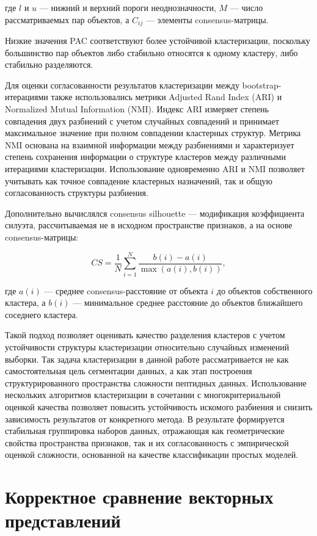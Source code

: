 \documentclass[specification,annotation,times]{itmo-student-thesis}
\begin{document}
где \(l\) и \(u\) --- нижний и верхний пороги неоднозначности,
\(M\) --- число рассматриваемых пар объектов,
а \(C_{ij}\) --- элементы consensus-матрицы.

Низкие значения PAC соответствуют более устойчивой кластеризации, поскольку большинство пар объектов либо стабильно относятся к одному кластеру, либо стабильно разделяются.

Для оценки согласованности результатов кластеризации между bootstrap-итерациями также использовались метрики Adjusted Rand Index (ARI) и Normalized Mutual Information (NMI). Индекс ARI измеряет степень совпадения двух разбиений с учетом случайных совпадений и принимает максимальное значение при полном совпадении кластерных структур. Метрика NMI основана на взаимной информации между разбиениями и характеризует степень сохранения информации о структуре кластеров между различными итерациями кластеризации. Использование одновременно ARI и NMI позволяет учитывать как точное совпадение кластерных назначений, так и общую согласованность структуры разбиения.

Дополнительно вычислялся consensus silhouette — модификация коэффициента силуэта, рассчитываемая не в исходном пространстве признаков, а на основе consensus-матрицы:

\[
CS =
\frac{1}{N}
\sum_{i=1}^{N}
\frac{
b(i)-a(i)
}{
\max(a(i), b(i))
},
\]

где \(a(i)\) --- среднее consensus-расстояние
от объекта \(i\) до объектов собственного кластера,
а \(b(i)\) --- минимальное среднее расстояние
до объектов ближайшего соседнего кластера.

Такой подход позволяет оценивать качество разделения кластеров с учетом устойчивости структуры кластеризации относительно случайных изменений выборки.
Так задача кластеризации в данной работе рассматривается не как самостоятельная цель сегментации данных, а как этап построения структурированного пространства сложности пептидных данных. Использование нескольких алгоритмов кластеризации в сочетании с многокритериальной оценкой качества позволяет повысить устойчивость искомого разбиения и снизить зависимость результатов от конкретного метода. В результате формируется стабильная группировка наборов данных, отражающая как геометрические свойства пространства признаков, так и их согласованность с эмпирической оценкой сложности, основанной на качестве классификации простых моделей.

\section{Корректное сравнение векторных представлений}
\end{document}
